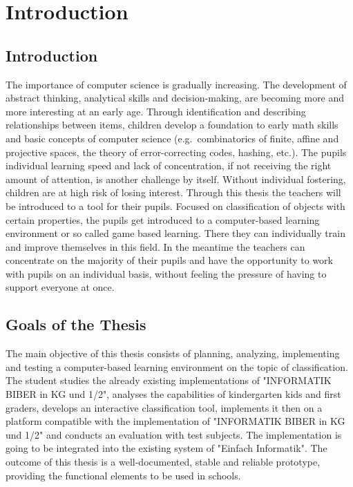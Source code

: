 
\setcounter{chapter}{0}

\chapter{Introduction}\label{ch:introduction}
\section{Introduction}\label{sec:introduction}
The importance of computer science is gradually increasing.
The development of abstract thinking, analytical skills and decision-making,
are becoming more and more interesting at an early age.
Through identification and describing relationships between items,
children develop a foundation to early math skills and basic concepts of computer science
(e.g.\ combinatorics of finite, affine and projective spaces, the theory of error-correcting codes, hashing, etc.)\cite{cardgameset}.
The pupils individual learning speed and lack of concentration,
if not receiving the right amount of attention, is another challenge by itself.
Without individual fostering, children are at high risk of losing interest.
Through this thesis the teachers will be introduced to a tool for their pupils.
Focused on classification of objects with certain properties, the pupils get introduced to a computer-based
learning environment or so called game based learning.
There they can individually train and improve themselves in this field.
In the meantime the teachers can concentrate on the majority of their pupils and have the opportunity to work with
pupils on an individual basis, without feeling the pressure of having to support everyone at once.

\section{Goals of the Thesis}\label{sec:goals-of-the-thesis}
The main objective of this thesis consists of planning, analyzing, implementing
and testing a computer-based learning environment on the topic of
classification. The student studies the already existing implementations of
"INFORMATIK BIBER in KG und 1/2", analyses the capabilities of kindergarten kids
and first graders, develops an interactive classification tool, implements it
then on a platform compatible with the implementation of "INFORMATIK BIBER in KG
und 1/2"\cite{ibkg12} and conducts an evaluation with test subjects.
The implementation is going to be integrated into the existing system of "Einfach Informatik"\cite{einfachinformatik}.
The outcome of this thesis is a well-documented, stable and
reliable prototype, providing the functional elements to be used in schools.


